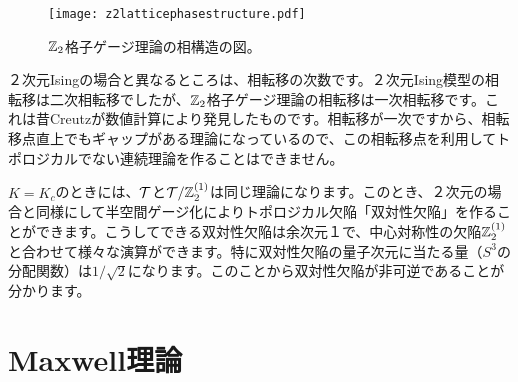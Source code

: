 \documentclass[generalized_symmetry.tex]{subfiles}
\begin{document}
\begin{figure}[htbp]
  \centering
  \texttt{[image: z2latticephasestructure.pdf]}
  \caption{$\mbox{$\mathbb{Z}_{2}$}$格子ゲージ理論の相構造の図。}
  \label{fig:z2latticephasestructure}
\end{figure}

２次元Isingの場合と異なるところは、相転移の次数です。２次元Ising模型の相転移は二次相転移でしたが、$\mbox{$\mathbb{Z}_{2}$}$格子ゲージ理論の相転移は一次相転移です。これは昔Creutzが数値計算により発見したものです。相転移が一次ですから、相転移点直上でもギャップがある理論になっているので、この相転移点を利用してトポロジカルでない連続理論を作ることはできません。

$K=K_c$のときには、$\mathcal{T}$と$\mathcal{T}/\mathbb{Z}_{2}^{(1)}$は同じ理論になります。このとき、２次元の場合と同様にして半空間ゲージ化によりトポロジカル欠陥「双対性欠陥」を作ることができます。こうしてできる双対性欠陥は余次元１で、中心対称性の欠陥$\mathbb{Z}_{2}^{(1)}$と合わせて様々な演算ができます。特に双対性欠陥の量子次元に当たる量（$S^3$の分配関数）は$1/\sqrt{2}$になります。このことから双対性欠陥が非可逆であることが分かります。

\section{Maxwell理論}
\end{document}
